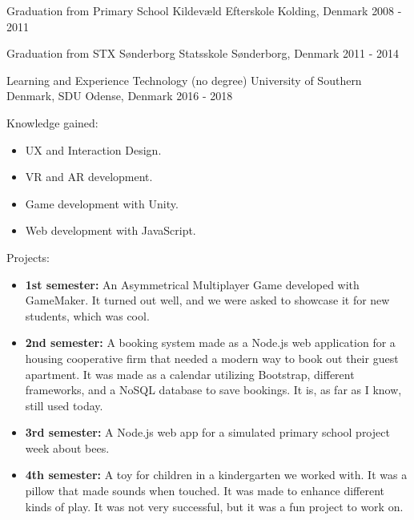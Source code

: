 
\begin{cventries}
\cventry
{Graduation from Primary School} %
{Kildevæld Efterskole} %
{Kolding, Denmark} %
{2008 - 2011} %
{} %

\cventry
{Graduation from STX} %
{Sønderborg Statsskole} %
{Sønderborg, Denmark} %
{2011 - 2014} %
{} %

\cventry
{Learning and Experience Technology (no degree)} %
{University of Southern Denmark, SDU} %
{Odense, Denmark} %
{2016 - 2018} %
{
  \begin{cvitems} %
    \item {Knowledge gained: }
    \begin{itemize} %
      \item {UX and Interaction Design.}
      \item {VR and AR development.}
      \item {Game development with Unity.}
      \item {Web development with JavaScript.}
    \end{itemize}
    \item {Projects: }
    \begin{itemize} %
      \item {\textbf{1st semester:} An Asymmetrical Multiplayer Game developed with GameMaker. It turned out well, and we were asked to showcase it for new students, which was cool.}
      \item {\textbf{2nd semester:} A booking system made as a Node.js web application for a housing cooperative firm that needed a modern way to book out their guest apartment. It was made as a calendar utilizing Bootstrap, different frameworks, and a NoSQL database to save bookings. It is, as far as I know, still used today.}
      \item {\textbf{3rd semester:} A Node.js web app for a simulated primary school project week about bees.}
      \item {\textbf{4th semester:} A toy for children in a kindergarten we worked with. It was a pillow that made sounds when touched. It was made to enhance different kinds of play. It was not very successful, but it was a fun project to work on.}
    \end{itemize}
  \end{cvitems}
}


\end{cventries}
